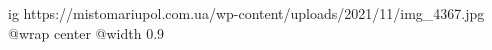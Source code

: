  
 
 
 
 

\ifcmt
  ig https://mistomariupol.com.ua/wp-content/uploads/2021/11/img_4367.jpg
  @wrap center
  @width 0.9
\fi
